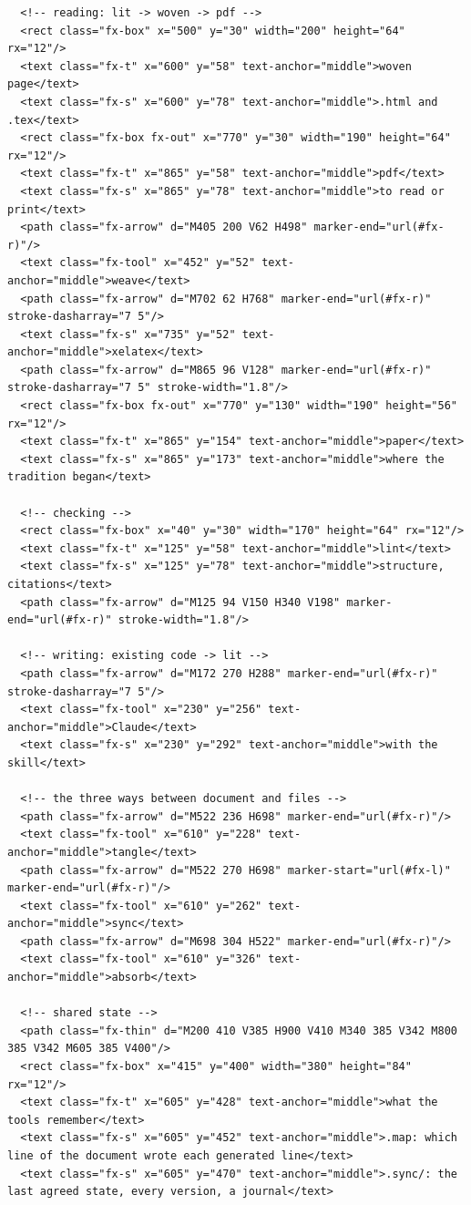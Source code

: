 \documentclass[10pt,a4paper]{article}
\begin{document}
\begin{Verbatim}
  <!-- reading: lit -> woven -> pdf -->
  <rect class="fx-box" x="500" y="30" width="200" height="64" rx="12"/>
  <text class="fx-t" x="600" y="58" text-anchor="middle">woven page</text>
  <text class="fx-s" x="600" y="78" text-anchor="middle">.html and .tex</text>
  <rect class="fx-box fx-out" x="770" y="30" width="190" height="64" rx="12"/>
  <text class="fx-t" x="865" y="58" text-anchor="middle">pdf</text>
  <text class="fx-s" x="865" y="78" text-anchor="middle">to read or print</text>
  <path class="fx-arrow" d="M405 200 V62 H498" marker-end="url(#fx-r)"/>
  <text class="fx-tool" x="452" y="52" text-anchor="middle">weave</text>
  <path class="fx-arrow" d="M702 62 H768" marker-end="url(#fx-r)" stroke-dasharray="7 5"/>
  <text class="fx-s" x="735" y="52" text-anchor="middle">xelatex</text>
  <path class="fx-arrow" d="M865 96 V128" marker-end="url(#fx-r)" stroke-dasharray="7 5" stroke-width="1.8"/>
  <rect class="fx-box fx-out" x="770" y="130" width="190" height="56" rx="12"/>
  <text class="fx-t" x="865" y="154" text-anchor="middle">paper</text>
  <text class="fx-s" x="865" y="173" text-anchor="middle">where the tradition began</text>

  <!-- checking -->
  <rect class="fx-box" x="40" y="30" width="170" height="64" rx="12"/>
  <text class="fx-t" x="125" y="58" text-anchor="middle">lint</text>
  <text class="fx-s" x="125" y="78" text-anchor="middle">structure, citations</text>
  <path class="fx-arrow" d="M125 94 V150 H340 V198" marker-end="url(#fx-r)" stroke-width="1.8"/>

  <!-- writing: existing code -> lit -->
  <path class="fx-arrow" d="M172 270 H288" marker-end="url(#fx-r)" stroke-dasharray="7 5"/>
  <text class="fx-tool" x="230" y="256" text-anchor="middle">Claude</text>
  <text class="fx-s" x="230" y="292" text-anchor="middle">with the skill</text>

  <!-- the three ways between document and files -->
  <path class="fx-arrow" d="M522 236 H698" marker-end="url(#fx-r)"/>
  <text class="fx-tool" x="610" y="228" text-anchor="middle">tangle</text>
  <path class="fx-arrow" d="M522 270 H698" marker-start="url(#fx-l)" marker-end="url(#fx-r)"/>
  <text class="fx-tool" x="610" y="262" text-anchor="middle">sync</text>
  <path class="fx-arrow" d="M698 304 H522" marker-end="url(#fx-r)"/>
  <text class="fx-tool" x="610" y="326" text-anchor="middle">absorb</text>

  <!-- shared state -->
  <path class="fx-thin" d="M200 410 V385 H900 V410 M340 385 V342 M800 385 V342 M605 385 V400"/>
  <rect class="fx-box" x="415" y="400" width="380" height="84" rx="12"/>
  <text class="fx-t" x="605" y="428" text-anchor="middle">what the tools remember</text>
  <text class="fx-s" x="605" y="452" text-anchor="middle">.map: which line of the document wrote each generated line</text>
  <text class="fx-s" x="605" y="470" text-anchor="middle">.sync/: the last agreed state, every version, a journal</text>


\end{Verbatim}
\end{document}
